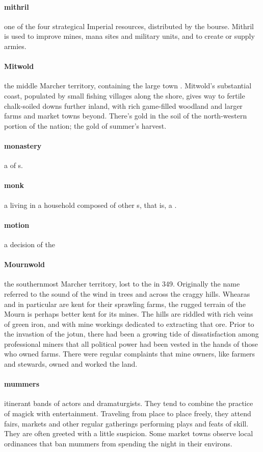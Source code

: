 \paragraph{mithril} one of the four strategical Imperial resources, distributed by the bourse. Mithril is used to improve mines, mana sites and military units, and to create or supply armies.
\paragraph{Mitwold} the middle Marcher territory, containing the large town . Mitwold's substantial  coast, populated by small fishing villages along the shore, gives way to fertile chalk-soiled downs further inland, with rich game-filled woodland and larger farms and market towns beyond. There's gold in the soil of the north-western portion of the nation; the gold of summer's harvest.
\paragraph{monastery} a  of s.
\paragraph{monk} a  living in a household composed of other s, that is, a .
\paragraph{motion} a decision of the 
\paragraph{Mournwold} the southernmost Marcher territory, lost to the  in 349. Originally the name referred to the sound of the wind in trees and across the craggy hills. Whearas  and  in particular are kent for their sprawling farms, the rugged terrain of the Mourn is perhaps better kent for its mines. The hills are riddled with rich veins of green iron, and with mine workings dedicated to extracting that ore. Prior to the invastion of the jotun, there had been a growing tide of dissatisfaction among professional miners that all political power had been vested in the hands of those who owned farms. There were regular complaints that mine owners, like farmers and stewards, owned and worked the land.
\paragraph{mummers} itinerant bands of actors and dramaturgists. They tend to combine the practice of  magick with entertainment. Traveling from place to place freely, they attend fairs, markets and other regular gatherings performing plays and feats of skill. They are often greeted with a little suspicion. Some market towns observe local ordinances that ban mummers from spending the night in their environs.
